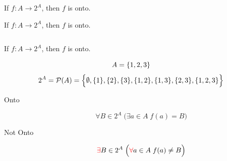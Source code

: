 
\begin{frame}{}
  \begin{theorem}
    If $f: A \to 2^{A}$, then $f$ is  onto.
  \end{theorem}

  \pause
  \vspace{0.60cm}
\end{frame}

\begin{frame}{}
  \begin{theorem}
    If $f: A \to 2^{A}$, then $f$ is  onto.
  \end{theorem}

  \vspace{0.60cm}
  \begin{columns}
      \pause
      \pause
      \pause
    \end{columns}
\end{frame}

\begin{frame}{}
  \begin{theorem}
    If $f: A \to 2^{A}$, then $f$ is  onto.
  \end{theorem}

  \vspace{0.30cm}
  \[
    A = \{1,2,3\}
  \]
  \pause
  \[
    2^{A} = \mathcal{P}(A) = \Big\{\emptyset, \{1\}, \{2\}, \{3\}, \{1,2\}, \{1,3\}, \{2,3\}, \{1,2,3\}\Big\}
  \]

  \pause
  \begin{description}
    \item[Onto]
      \[
        \forall B \in 2^{A}\; \Big(\exists a \in A\; f(a) = B\Big)
      \]
    \pause
    \item[Not Onto]
      \[
        \textcolor{red}{\exists} B \in 2^{A}\; \Big(\textcolor{red}{\forall} a \in A\; f(a) \neq B\Big)
      \]
  \end{description}
\end{frame}

